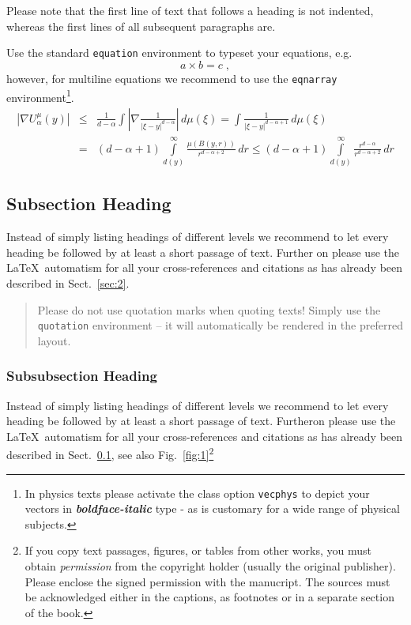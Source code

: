 Please note that the first line of text that follows a heading is not indented, whereas the first lines of all subsequent paragraphs are.

\eject

Use the standard \verb|equation| environment to typeset your equations, e.g.
%
\begin{equation}
a \times b = c\;,
\end{equation}
%
however, for multiline equations we recommend to use the \verb|eqnarray| environment\footnote{In physics texts please activate the class option \texttt{vecphys} to depict your vectors in \textbf{\itshape boldface-italic} type - as is customary for a wide range of physical subjects.}.
\begin{eqnarray}
\left|\nabla U_{\alpha}^{\mu}(y)\right| &\le&\frac1{d-\alpha}\int
\left|\nabla\frac1{|\xi-y|^{d-\alpha}}\right|\,d\mu(\xi) =
\int \frac1{|\xi-y|^{d-\alpha+1}} \,d\mu(\xi)\qquad  \\
&=&(d-\alpha+1) \int\limits_{d(y)}^\infty
\frac{\mu(B(y,r))}{r^{d-\alpha+2}}\,dr \le (d-\alpha+1)
\int\limits_{d(y)}^\infty \frac{r^{d-\alpha}}{r^{d-\alpha+2}}\,dr
\label{eq:10}
\end{eqnarray}

\enlargethispage{24pt}

\subsection{Subsection Heading}
\label{subsec:2}
Instead of simply listing headings of different levels we recommend to let every heading be followed by at least a short passage of text. Further on please use the \LaTeX\ automatism for all your cross-references and citations as has already been described in Sect.~\ref{sec:2}.

\begin{quotation}
Please do not use quotation marks when quoting texts! Simply use the \verb|quotation| environment -- it will automatically be rendered in the preferred layout.
\end{quotation}


\subsubsection{Subsubsection Heading}
Instead of simply listing headings of different levels we recommend to let every heading be followed by at least a short passage of text. Furtheron please use the \LaTeX\ automatism for all your cross-references and citations as has already been described in Sect.~\ref{subsec:2}, see also Fig.~\ref{fig:1}\footnote{If you copy text passages, figures, or tables from other works, you must obtain \textit{permission} from the copyright holder (usually the original publisher). Please enclose the signed permission with the manucript. The sources must be acknowledged either in the captions, as footnotes or in a separate section of the book.}

